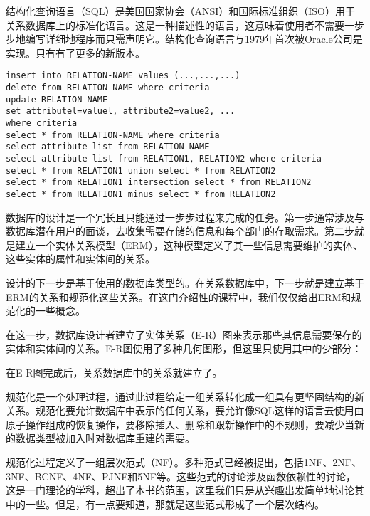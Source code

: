 结构化查询语言（SQL）是美国国家协会（ANSI）和国际标准组织（ISO）用于关系数据库上的标准化语言。这是一种描述性的语言，这意味着使用者不需要一步步地编写详细地程序而只需声明它。结构化查询语言与1979年首次被Oracle公司是实现。只有有了更多的新版本。
\begin{verbatim}
insert into RELATION-NAME values (...,...,...)
delete from RELATION-NAME where criteria
update RELATION-NAME
set attributel=valuel, attribute2=value2, ...
where criteria
select * from RELATION-NAME where criteria
select attribute-list from RELATION-NAME
select attribute-list from RELATION1, RELATION2 where criteria
select * from RELATION1 union select * from RELATION2
select * from RELATION1 intersection select * from RELATION2
select * from RELATION1 minus select * from RELATION2
\end{verbatim}
数据库的设计是一个冗长且只能通过一步步过程来完成的任务。第一步通常涉及与数据库潜在用户的面谈，去收集需要存储的信息和每个部门的存取需求。第二步就是建立一个实体关系模型（ERM），这种模型定义了其一些信息需要维护的实体、这些实体的属性和实体间的关系。 \par
设计的下一步是基于使用的数据库类型的。在关系数据库中，下一步就是建立基于ERM的关系和规范化这些关系。在这门介绍性的课程中，我们仅仅给出ERM和规范化的一些概念。 \par
在这一步，数据库设计者建立了实体关系（E-R）图来表示那些其信息需要保存的实体和实体间的关系。E-R图使用了多种几何图形，但这里只使用其中的少部分： \par
在E-R图完成后，关系数据库中的关系就建立了。\par
规范化是一个处理过程，通过此过程给定一组关系转化成一组具有更坚固结构的新关系。规范化要允许数据库中表示的任何关系，要允许像SQL这样的语言去使用由原子操作组成的恢复操作，要移除插入、删除和跟新操作中的不规则，要减少当新的数据类型被加入时对数据库重建的需要。\par
规范化过程定义了一组层次范式（NF）。多种范式已经被提出，包括1NF、2NF、3NF、BCNF、4NF、PJNF和5NF等。这些范式的讨论涉及函数依赖性的讨论，这是一门理论的学科，超出了本书的范围，这里我们只是从兴趣出发简单地讨论其中的一些。但是，有一点要知道，那就是这些范式形成了一个层次结构。
